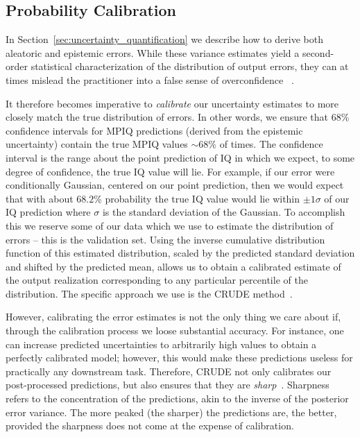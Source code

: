 \subsection{Probability Calibration}\label{sec:DL_probability_calibration}

In Section~\ref{sec:uncertainty_quantification} we describe how to derive both aleatoric and epistemic errors. While these variance estimates yield a second-order statistical characterization of the distribution of output errors, they can at times mislead the practitioner into a false sense of overconfidence%
~\citep{lakshminarayanan_probability_calibration0, probability_calibration1, crude_probability_calibration}.  

It therefore becomes imperative to {\it calibrate} our uncertainty estimates to more closely match the true distribution of errors. In other words, we ensure that 68\% confidence intervals for MPIQ predictions (derived from the epistemic uncertainty) contain the true MPIQ values $\sim 68\%$ of times. The confidence interval is the range about the point prediction of IQ in which we expect, to some degree of confidence, the true IQ value will lie.  For example, if our error were conditionally Gaussian, centered on our point prediction, then we would expect that with about $68.2$\% probability the true IQ value would lie within $\pm 1\sigma$ of our IQ prediction where $\sigma$ is the standard deviation of the Gaussian. To accomplish this we reserve some of our data which we use to estimate the distribution of errors -- this is the validation set. Using the inverse cumulative distribution function of this estimated distribution, scaled by the predicted standard deviation and shifted by the predicted mean, allows us to obtain a calibrated estimate of the output realization corresponding to any particular percentile of the distribution. The specific approach we use is the CRUDE method~\cite{crude_probability_calibration}.

However, calibrating the error estimates is not the only thing we care about if, through the calibration process we loose substantial accuracy. For instance, one can increase predicted uncertainties to arbitrarily high values to obtain a perfectly calibrated model; however, this would make these predictions useless for practically any downstream task. Therefore, CRUDE not only calibrates our post-processed predictions, but also ensures that they are  {\it sharp}~\citep{measuring_calibration_in_deep_learning}. Sharpness refers to the concentration of the predictions, akin to the inverse of the posterior error variance.  The more peaked (the sharper) the predictions are, the better, provided the sharpness does not come at the expense of calibration.  

